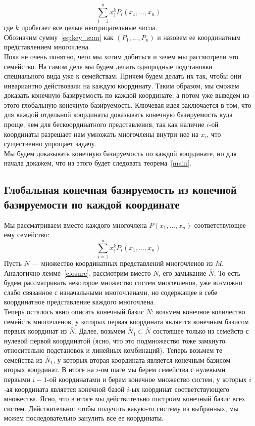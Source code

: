 \begin{equation}
    \label{eq:key_sum}
    \sum\limits_{i=1}^n x_i^k P_i(x_1,\ldots,x_n)
\end{equation}
где $k$ пробегает все целые неотрицательные числа.\\
Обозначим сумму~\eqref{eq:key_sum} как $(P_1,\ldots,P_n)$ и назовем ее координатным представлением многочлена.\\
Пока не очень понятно, чего мы хотим добиться и зачем мы рассмотрели это семейство.
На самом деле мы будем делать однородные подстановки специального вида уже к семействам.
Причем будем делать их так, чтобы они инвариантно действовали на каждую координату.
Таким образом, мы сможем доказать конечную базируемость по каждой координате, а потом уже выведем из этого глобальную конечную базируемость.
Ключевая идея заключается в том, что для каждой отдельной координаты доказывать конечную базируемость куда проще, чем для бескоординатного представления, так как наличие $i$-ой координаты разрешает нам умножать многочлены внутри нее на $x_i$, что существенно упрощает задачу.\\

Мы будем доказывать конечную базируемость по каждой координате, но для начала докажем, что из этого будет следовать теорема~\ref{main}.

\subsection{Глобальная конечная базируемость из конечной базируемости по каждой координате}\label{subsec:grishin-global-from-local}
Мы рассматриваем вместо каждого многочлена $P(x_1,\ldots,x_n)$ соответствующее ему семейство:
\[\sum\limits_{i=1}^n x_i^k P_i(x_1,\ldots,x_n)\] Пусть $N$ --- множество координатных представлений многочленов из $M$.
Аналогично лемме~\ref{closure}, рассмотрим вместо $N$, его замыкание $\overline{N}$.
То есть будем рассматривать некоторое множество систем многочленов, уже возможно слабо связанное с изначальными многочленами, но содержащее в себе координатное представление каждого многочлена.\\
Теперь осталось явно описать конечный базис $\overline{N}$: возьмем конечное количество семейств многочленов, у которых первая координата является конечным базисом первых координат из $\overline{N}$.
Далее, возьмем $\overline{N}_1\subset \overline{N}$ состоящее только из семейств с нулевой первой координатой (ясно, что это подмножество тоже замкнуто относительно подстановок и линейных комбинаций).
Теперь возьмем те семейства из $\overline{N}_1$, у которых вторая координата является конечным базисом вторых координат.
В итоге на $i$-ом шаге мы берем семейства с нулевыми первыми $i-1$-ой координатами и берем конечное множество систем, у которых $i$-ая координата является конечной базой $i$-ых координат соответствующего множества.
Ясно, что в итоге мы действительно построим конечный базис всех систем.
Действительно: чтобы получить какую-то систему из выбранных, мы можем последовательно занулить все ее координаты.

